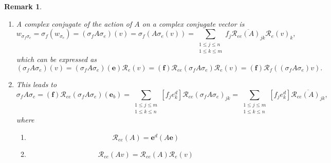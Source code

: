 \documentclass[aps,preprint]{revtex4}%
\newtheorem{remark}[theorem]{Remark}
\begin{document}
\begin{remark}
\begin{enumerate}
\item A complex conjugate of the action of $A$ on a complex conjugate vector
is
\begin{equation}
w_{\mathcal{\sigma}_{f}\mathcal{\sigma}_{e}}=\mathcal{\sigma}_{f}\left(
w_{\mathcal{\sigma}_{e}}\right)  =\left(  \mathcal{\sigma}_{f}A\mathcal{\sigma
}_{e}\right)  \left(  v\right)  =\mathcal{\sigma}_{f}\left(  A\mathcal{\sigma
}_{e}\left(  v\right)  \right)  =\sum_{\substack{1\leq j\leq n\\1\leq k\leq
m}}f_{j}\overline{\mathcal{R}_{ee}\left(  A\right)  _{jk}}\mathcal{R}%
_{e}\left(  v\right)  _{k},
\end{equation}
which can be expressed as
\begin{equation}
\left(  \mathcal{\sigma}_{f}A\mathcal{\sigma}_{e}\right)  \left(  v\right)
=\left(  \mathcal{\sigma}_{f}A\mathcal{\sigma}_{e}\right)  \left(
\boldsymbol{e}\right)  \mathcal{R}_{e}\left(  v\right)  =\left(
\boldsymbol{f}\right)  \mathcal{R}_{ee}\left(  \mathcal{\sigma}_{f}%
A\mathcal{\sigma}_{e}\right)  \mathcal{R}_{e}\left(  v\right)  =\left(
\boldsymbol{f}\right)  \mathcal{R}_{f}\left(  \left(  \mathcal{\sigma}%
_{f}A\mathcal{\sigma}_{e}\right)  v\right)  .
\end{equation}


\item This leads to
\begin{equation}
\mathcal{\sigma}_{f}A\mathcal{\sigma}_{e}=\left(  \boldsymbol{f}\right)
\mathcal{R}_{ee}\left(  \mathcal{\sigma}_{f}A\mathcal{\sigma}_{e}\right)
\left(  \mathbf{e}_{b}\right)  =\sum_{\substack{1\leq j\leq m\\1\leq k\leq
n}}\left[  f_{j}e_{k}^{d}\right]  \mathcal{R}_{ee}\left(  \mathcal{\sigma}%
_{f}A\mathcal{\sigma}_{e}\right)  _{jk}=\sum_{\substack{1\leq j\leq m\\1\leq
k\leq n}}\left[  f_{j}e_{k}^{d}\right]  \overline{\mathcal{R}_{ee}\left(
A\right)  _{jk}},
\end{equation}
where

\begin{enumerate}
\item
\begin{equation}
\mathcal{R}_{ee}\left(  A\right)  =\boldsymbol{e}^{d}\left(  A\boldsymbol{e}%
\right)
\end{equation}


\item
\begin{equation}
\mathcal{R}_{ee}\left(  Av\right)  =\mathcal{R}_{ee}\left(  A\right)
\mathcal{R}_{e}\left(  v\right)
\end{equation}



\end{enumerate}
\end{enumerate}
\end{remark}
\end{document}
